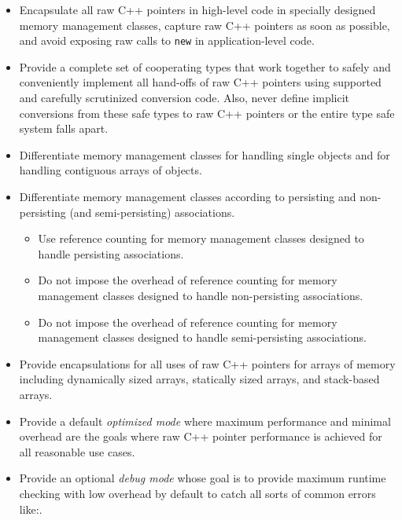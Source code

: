 \documentclass[pdf,ps2pdf,11pt]{SANDreport}
\begin{document}
\begin{itemize}

{}\item Encapsulate all raw C++ pointers in high-level code in
specially designed memory management classes, capture raw C++ pointers
as soon as possible, and avoid exposing raw calls to {}\texttt{new} in
application-level code.

{}\item Provide a complete set of cooperating types that work together
to safely and conveniently implement all hand-offs of raw C++
pointers using supported and carefully scrutinized conversion code.
Also, never define implicit conversions from these safe types to raw
C++ pointers or the entire type safe system falls apart.

{}\item Differentiate memory management classes for handling single
objects and for handling contiguous arrays of objects.

{}\item Differentiate memory management classes according to
persisting and non-persisting (and semi-persisting) associations.

  \begin{itemize}

  {}\item Use reference counting for memory management classes
  designed to handle persisting associations.

  {}\item Do not impose the overhead of reference counting for memory
  management classes designed to handle non-persisting associations.

  {}\item Do not impose the overhead of reference counting for memory
  management classes designed to handle semi-persisting associations.

  \end{itemize}

{}\item Provide encapsulations for all uses of raw C++ pointers for
arrays of memory including dynamically sized arrays, statically sized
arrays, and stack-based arrays.

{}\item Provide a default {}\textit{optimized mode} where maximum
performance and minimal overhead are the goals where raw C++ pointer
performance is achieved for all reasonable use cases.

{}\item Provide an optional {}\textit{debug mode} whose goal is to
provide maximum runtime checking with low overhead by default to catch
all sorts of common errors like:.


\end{itemize}
\end{document}
